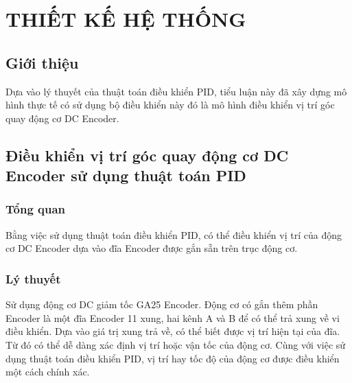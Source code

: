 
\chapter{THIẾT KẾ HỆ THỐNG} %

\label{Chapter2} %





\section{Giới thiệu}
Dựa vào lý thuyết của thuật toán điều khiển PID, tiểu luận này đã xây dựng mô hình thực tế có sử dụng bộ điều khiển này đó là mô hình điều khiển vị trí góc quay động cơ DC Encoder.


\section{Điều khiển vị trí góc quay động cơ DC Encoder sử dụng thuật toán PID}

\subsection{Tổng quan}
Bằng việc sử dụng thuật toán điều khiển PID, có thể điều khiển vị trí của động cơ DC Encoder dựa vào đĩa Encoder được gắn sẵn trên trục động cơ. 

\subsection{Lý thuyết}

Sử dụng động cơ DC giảm tốc GA25 Encoder. Động cơ có gắn thêm phần Encoder là một đĩa Encoder 11 xung, hai kênh A và B để có thể trả xung về vi điều khiển. Dựa vào giá trị xung trả về, có thể biết được vị trí hiện tại của đĩa. Từ đó có thể dễ dàng xác định vị trí hoặc vận tốc của động cơ. Cùng với việc sử dụng thuật toán điều khiển PID, vị trí hay tốc độ của động cơ được điều khiển một cách chính xác. 

